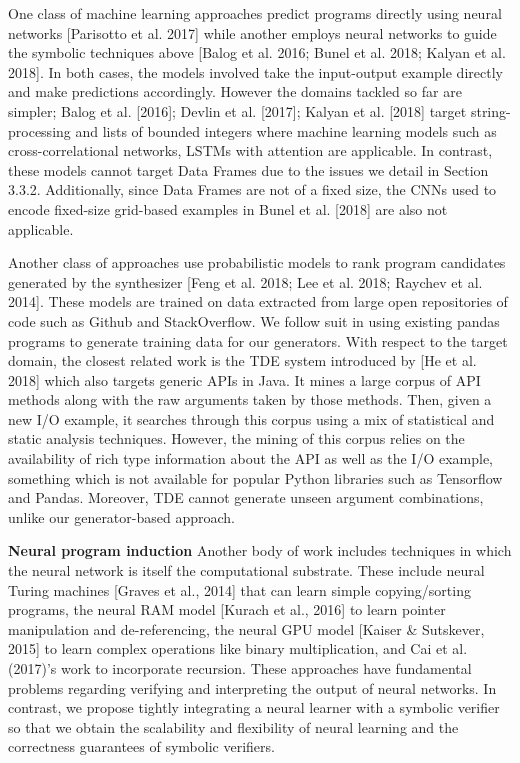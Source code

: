 \documentclass{article}
\begin{document}
One class of machine learning approaches predict programs directly using neural networks [Parisotto et al. 2017] while another employs neural networks to guide the symbolic techniques above [Balog et al. 2016; Bunel et al. 2018; Kalyan et al. 2018]. In both cases, the models involved take the input-output example directly and make predictions accordingly. However the domains tackled so far are simpler; Balog et al. [2016]; Devlin et al. [2017]; Kalyan et al. [2018] target string-processing and lists of bounded integers where machine learning models such as cross-correlational networks, LSTMs with attention are applicable. In contrast, these models cannot target Data Frames due to the issues we detail in Section 3.3.2. Additionally, since Data Frames are not of a fixed size, the CNNs used to encode fixed-size grid-based examples in Bunel et al. [2018] are also not applicable.

Another class of approaches use probabilistic models to rank program candidates generated by the synthesizer [Feng et al. 2018; Lee et al. 2018; Raychev et al. 2014]. These models are trained on data extracted from large open repositories of code such as Github and StackOverflow. We follow suit in using existing pandas programs to generate training data for our generators. With respect to the target domain, the closest related work is the TDE system introduced by [He et al. 2018] which also targets generic APIs in Java. It mines a large corpus of API methods along with the raw arguments taken by those methods. Then, given a new I/O example, it searches through this corpus using a mix of statistical and static analysis techniques. However, the mining of this corpus relies on the availability of rich type information about the API as well as the I/O example, something which is not available for popular Python libraries such as Tensorflow and Pandas. Moreover, TDE cannot generate unseen argument combinations, unlike our generator-based approach.

\textbf{Neural program induction}
Another body of work includes techniques in which the neural network is itself the computational substrate. These include neural Turing machines [Graves et al., 2014] that can learn simple copying/sorting programs, the neural RAM model [Kurach et al., 2016] to learn pointer manipulation and de-referencing, the neural GPU model [Kaiser & Sutskever, 2015] to learn complex operations like binary multiplication, and Cai et al. (2017)’s work to incorporate recursion. These approaches have fundamental problems regarding verifying and interpreting the output of neural networks. In contrast, we propose tightly integrating a neural learner with a symbolic verifier so that we obtain the scalability and flexibility of neural learning and the correctness guarantees of symbolic verifiers.
\end{document}
